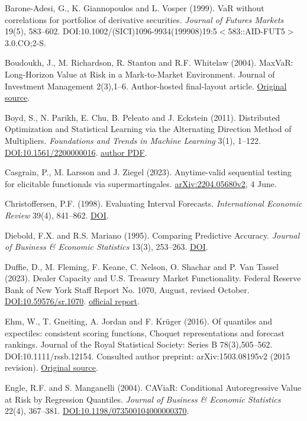 \documentclass[11pt,a4paper]{article}
\begin{document}
Barone-Adesi, G., K. Giannopoulos and L. Vosper (1999). VaR without correlations for portfolios of derivative securities. \emph{Journal of Futures Markets} 19(5), 583--602. DOI:10.1002/(SICI)1096-9934(199908)19:5\( < \)583::AID-FUT5\( > \)3.0.CO;2-S.

Boudoukh, J., M. Richardson, R. Stanton and R.F. Whitelaw (2004). MaxVaR: Long-Horizon Value at Risk in a Mark-to-Market Environment. Journal of Investment Management 2(3),1--6. Author-hosted final-layout article. \href{https://pages.stern.nyu.edu/~rwhitela/papers/maxvar\%20joim04.pdf}{Original source}.

Boyd, S., N. Parikh, E. Chu, B. Peleato and J. Eckstein (2011). Distributed Optimization and Statistical Learning via the Alternating Direction Method of Multipliers. \emph{Foundations and Trends in Machine Learning} 3(1), 1--122. \href{https://doi.org/10.1561/2200000016}{DOI:10.1561/2200000016}. \href{https://web.stanford.edu/~boyd/papers/pdf/admm_distr_stats.pdf}{author PDF}.

Casgrain, P., M. Larsson and J. Ziegel (2023). Anytime-valid sequential testing for elicitable functionals via supermartingales. \href{https://arxiv.org/abs/2204.05680v2}{arXiv:2204.05680v2}, 4 June.

Christoffersen, P.F. (1998). Evaluating Interval Forecasts. \emph{International Economic Review} 39(4), 841--862. \href{https://doi.org/10.2307/2527341}{DOI}.

Diebold, F.X. and R.S. Mariano (1995). Comparing Predictive Accuracy. \emph{Journal of Business \& Economic Statistics} 13(3), 253--263. \href{https://doi.org/10.1080/07350015.1995.10524599}{DOI}.

Duffie, D., M. Fleming, F. Keane, C. Nelson, O. Shachar and P. Van Tassel (2023). Dealer Capacity and U.S. Treasury Market Functionality. Federal Reserve Bank of New York Staff Report No. 1070, August, revised October. \href{https://doi.org/10.59576/sr.1070}{DOI:10.59576/sr.1070}. \href{https://www.newyorkfed.org/medialibrary/media/research/staff_reports/sr1070.pdf}{official report}.

Ehm, W., T. Gneiting, A. Jordan and F. Krüger (2016). Of quantiles and expectiles: consistent scoring functions, Choquet representations and forecast rankings. Journal of the Royal Statistical Society: Series B 78(3),505--562. DOI:10.1111/rssb.12154. Consulted author preprint: arXiv:1503.08195v2 (2015 revision). \href{https://doi.org/10.1111/rssb.12154}{Original source}.

Engle, R.F. and S. Manganelli (2004). CAViaR: Conditional Autoregressive Value at Risk by Regression Quantiles. \emph{Journal of Business \& Economic Statistics} 22(4), 367--381. \href{https://doi.org/10.1198/073500104000000370}{DOI:10.1198/073500104000000370}.
\end{document}
